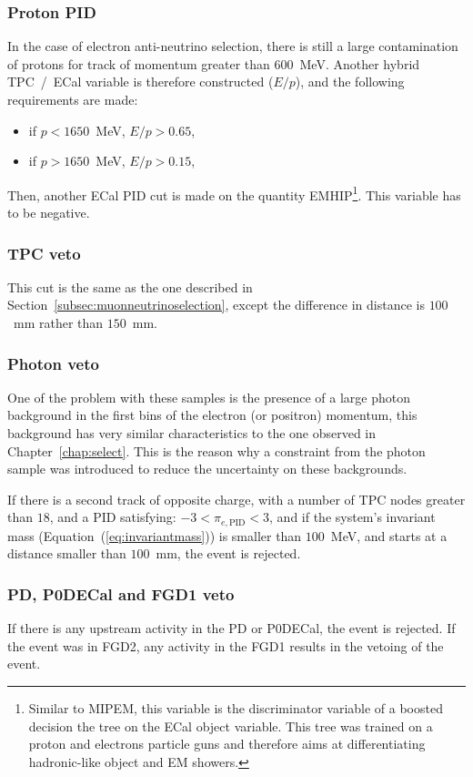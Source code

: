 \subsubsection{Proton \Gls{PID}}
In the case of electron anti-neutrino selection, there is still a
large contamination of protons for track of momentum greater than
$600$~MeV.  Another hybrid \Gls{TPC}~/~\Gls{ECal} variable is
therefore constructed ($E/p$), and the following requirements are
made:
\begin{itemize}[noitemsep,topsep=0pt]
\item if $p<1650$~MeV, $E/p > 0.65$,
\item if $p>1650$~MeV, $E/p > 0.15$,
\end{itemize}
Then, another \Gls{ECal} \Gls{PID} cut is made on the quantity
\Gls{EMHIP}\footnote{Similar to \Gls{MIPEM}, this variable is the
  discriminator variable of a boosted decision the tree on the
  \Gls{ECal} object variable. This tree was trained on a proton and
  electrons particle guns and therefore aims at differentiating
  hadronic-like object and \Gls{EM} showers.}. This variable has to be
negative.

\subsubsection{\Gls{TPC} veto}
This cut is the same as the one described in
Section~\ref{subsec:muonneutrinoselection}, except the difference
in distance is $100$~mm rather than $150$~mm.

\subsubsection{Photon veto}
One of the problem with these samples is the presence of a large
photon background in the first bins of the electron (or positron)
momentum, this background has very similar characteristics to the one
observed in Chapter~\ref{chap:select}. This is the reason why a
constraint from the photon sample was introduced to reduce the
uncertainty on these backgrounds.

If there is a second track of opposite charge, with a number of
\Gls{TPC} nodes greater than $18$, and a \Gls{PID} satisfying:
$-3<\pi_{e, \text{PID}} < 3$, and if the system's invariant mass
(Equation~(\ref{eq:invariantmass})) is smaller than $100$~MeV, and
starts at a distance smaller than $100$~mm, the event is rejected.

\subsubsection{\Gls{PD}, \Gls{P0DECal} and \Gls{FGD}1 veto}
If there is any upstream activity in the \Gls{PD} or \Gls{P0DECal},
the event is rejected. If the event was in \Gls{FGD}2, any activity in
the \Gls{FGD}1 results in the vetoing of the event.

